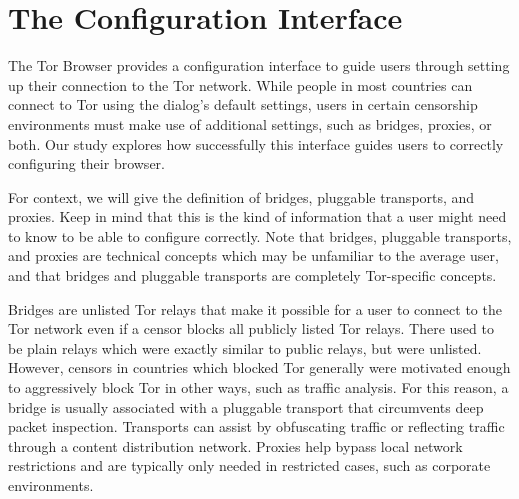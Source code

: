 \documentclass{template}
\begin{document}
\section{The Configuration Interface}

The Tor Browser provides a configuration interface to guide users through setting up 
their connection to the
Tor network. While people in most countries can connect to Tor using the
dialog's default settings, users in certain censorship environments must
make use of additional settings, such as bridges, proxies, or both. 
Our study explores how successfully this interface guides users to
correctly configuring their browser.

For context, we will give the definition of bridges, pluggable transports, and proxies. 
Keep in mind that this is the kind of information that a user might need to know to be able
to configure correctly. Note that bridges, pluggable transports, and proxies are technical 
concepts which may be unfamiliar to the average user, and that bridges and pluggable
transports are completely Tor-specific concepts. 

Bridges are unlisted Tor relays that make it possible for a user to connect
to the Tor network even if a censor blocks all publicly listed Tor relays. There used 
to be plain relays which were exactly similar to public relays, but were unlisted. However, 
censors in countries which blocked Tor generally were motivated enough to aggressively
block Tor in other ways, such as traffic analysis. For this reason, a bridge is usually associated
with a pluggable transport that circumvents deep packet inspection. Transports can
assist by obfuscating traffic or reflecting traffic through a content distribution network. 
Proxies help bypass local network restrictions and are typically only
needed in restricted cases, such as corporate environments.\\

\end{document}
